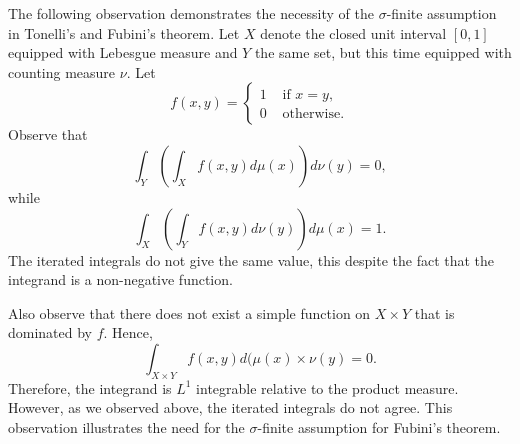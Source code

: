 \documentclass[12pt]{article}
\begin{document}
The following observation demonstrates the necessity of the
$\sigma$-finite assumption in Tonelli's and Fubini's theorem.  Let $X$
denote the closed unit interval $[0,1]$ equipped with Lebesgue measure
and $Y$ the same set, but this time equipped with counting measure
$\nu$.  Let
\[ f(x,y) = \left\{
  \begin{array}{cl}
    1 & \mbox{ if } x=y,\\
    0 & \mbox{ otherwise}.
  \end{array}\right.
\]
Observe that 
\[ \int_Y \left( \int_X f(x,y) d\mu(x)\right) d\nu(y) = 0,\]
while
\[ \int_X \left( \int_Y f(x,y) d\nu(y)\right) d\mu(x) = 1.\]
The iterated integrals do not give the same value, this despite the
fact that the integrand is a non-negative function.  

Also observe that there does not exist a simple function on $X\times
Y$ that is dominated by $f$.  Hence,
\[ \int_{X\times Y} f(x,y) d (\mu(x)\times \nu(y) = 0.\]
Therefore,  the integrand is $L^1$ integrable
relative to the product measure. However, as we observed above, the
iterated integrals do not agree.  This observation illustrates the need for the
$\sigma$-finite assumption for Fubini's theorem.

\end{document}
